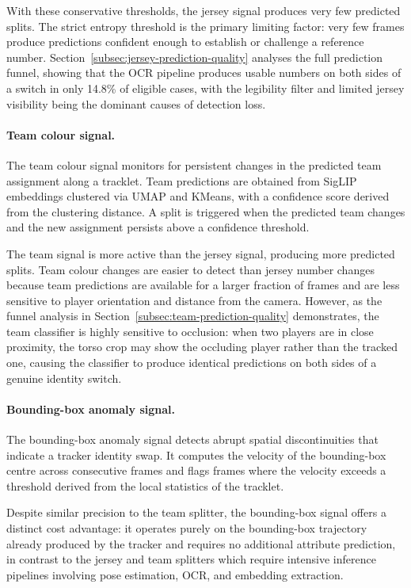 With these conservative thresholds, the jersey signal produces very few predicted splits. The strict entropy threshold is the primary limiting factor: very few frames produce predictions confident enough to establish or challenge a reference number. Section~\ref{subsec:jersey-prediction-quality} analyses the full prediction funnel, showing that the OCR pipeline produces usable numbers on both sides of a switch in only 14.8\% of eligible cases, with the legibility filter and limited jersey visibility being the dominant causes of detection loss.

\paragraph{Team colour signal.}
The team colour signal monitors for persistent changes in the predicted team assignment along a tracklet. Team predictions are obtained from SigLIP embeddings clustered via UMAP and KMeans, with a confidence score derived from the clustering distance. A split is triggered when the predicted team changes and the new assignment persists above a confidence threshold.

The team signal is more active than the jersey signal, producing more predicted splits. Team colour changes are easier to detect than jersey number changes because team predictions are available for a larger fraction of frames and are less sensitive to player orientation and distance from the camera. However, as the funnel analysis in Section~\ref{subsec:team-prediction-quality} demonstrates, the team classifier is highly sensitive to occlusion: when two players are in close proximity, the torso crop may show the occluding player rather than the tracked one, causing the classifier to produce identical predictions on both sides of a genuine identity switch.

\paragraph{Bounding-box anomaly signal.}
The bounding-box anomaly signal detects abrupt spatial discontinuities that indicate a tracker identity swap. It computes the velocity of the bounding-box centre across consecutive frames and flags frames where the velocity exceeds a threshold derived from the local statistics of the tracklet.

Despite similar precision to the team splitter, the bounding-box signal offers a distinct cost advantage: it operates purely on the bounding-box trajectory already produced by the tracker and requires no additional attribute prediction, in contrast to the jersey and team splitters which require intensive inference pipelines involving pose estimation, OCR, and embedding extraction.

